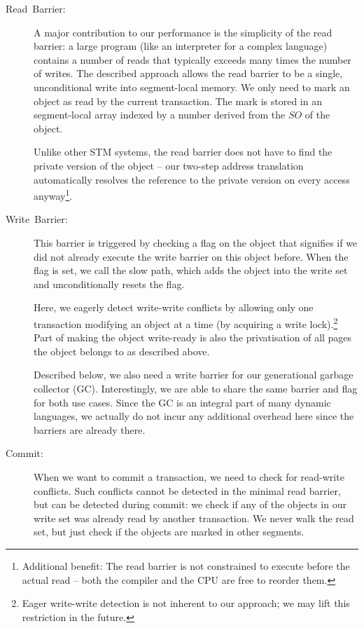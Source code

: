 \documentclass{sigplanconf}
\begin{document}
\begin{description}

\item [{Read~Barrier:}] A major contribution to our performance
  is the simplicity of the read barrier: a large program (like an
  interpreter for a complex language) contains a number of reads that
  typically exceeds many times the number of writes.  The described
  approach allows the read barrier to be a single, unconditional
  write into segment-local memory. We only need to mark an object
  as read by the current transaction. The mark is stored in an
  segment-local array indexed by a number derived from the $SO$
  of the object.

  Unlike other STM systems, the read barrier does not have to find the
  private version of the object -- our two-step address translation
  automatically resolves the reference to the private version on every
  access anyway\footnote{Additional benefit: The read barrier is not
    constrained to execute before the actual read -- both the compiler and
    the CPU are free to reorder them.}.

\item [{Write~Barrier:}] This barrier is triggered by checking a flag
  on the object that signifies if we did not already execute the write
  barrier on this object before.  When the flag is set, we call the slow
  path, which adds the object into the write set and unconditionally
  resets the flag.

  Here, we eagerly detect write-write conflicts by allowing only one
  transaction modifying an object at a time (by acquiring a write
  lock).\footnote{Eager write-write detection is not inherent to our
    approach; we may lift this restriction in the future.}  Part of making
  the object write-ready is also the privatisation of all pages the
  object belongs to as described above.

  Described below, we also need a write barrier for our generational
  garbage collector (GC). Interestingly, we are able to share the same
  barrier and flag for both use cases. Since the GC is an integral
  part of many dynamic languages, we actually do not incur any additional
  overhead here since the barriers are already there.

\item [{Commit:}] When we want to commit a transaction, we need to check
  for read-write conflicts.  Such conflicts cannot be detected in the
  minimal read barrier, but can be detected during commit: we check
  if any of the objects in our write set was already read by another
  transaction. We never walk the read set, but just check if the objects
  are marked in other segments.


\end{description}
\end{document}
